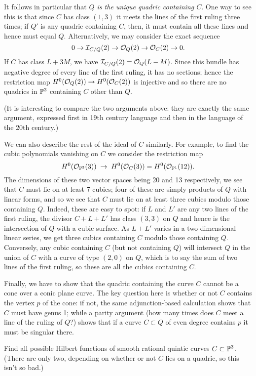 It follows in particular that \emph{$Q$ is the unique quadric containing $C$}. One way to see this is that since $C$ has class $(1,3)$ it meets the lines of the first ruling three times; if $Q'$ is any quadric containing $C$, then, it must contain all these lines and hence must equal $Q$. Alternatively, we may consider the exact sequence
$$
0 \to {\mathcal I}_{C/Q}(2) \to {\mathcal O}_Q(2)  \to {\mathcal O}_C(2) \to 0.
$$
If $C$ has class $L+3M$, we have ${\mathcal I}_{C/Q}(2) = {\mathcal O}_{Q}(L-M)$. Since this bundle has negative degree of every line of the first ruling, it has no sections; hence the restriction map $H^0({\mathcal O}_Q(2))  \to H^0({\mathcal O}_C(2))$ is injective and so there are no  quadrics in ${\mathbb P}^3$ containing $C$ other than $Q$.

(It is interesting to compare the two arguments above: they are exactly the same argument, expressed first in 19th century language and then in the language of the 20th century.)

We can also describe the rest of the ideal of $C$ similarly. For example, to find the cubic polynomials vanishing on $C$ we consider the restriction map
$$
H^0({\mathcal O}_{{\mathbb P}^3}(3)) \; \to \; H^0({\mathcal O}_{C}(3)) = H^0({\mathcal O}_{{\mathbb P}^1}(12)).
$$
The dimensions of these two vector spaces being 20 and 13 respectively, we see that $C$ must lie on at least 7 cubics; four of these are simply products of $Q$ with linear forms, and so we see that $C$ must lie on at least three cubics modulo those containing $Q$. Indeed, these are easy to spot: if $L$ and $L'$ are any two lines of the first ruling, the divisor $C + L + L'$ has class $(3,3)$ on $Q$ and hence is the intersection of $Q$ with a cubic surface. As $L+L'$ varies in a two-dimensional linear series, we get three cubics containing $C$ modulo those containing $Q$. Conversely, any cubic containing $C$ (but not containing $Q$) will intersect $Q$ in the union of $C$ with a curve of type $(2,0)$ on $Q$, which is to say the sum of two lines of the first ruling, so these are all the cubics containing $C$.

Finally, we have to show that the quadric containing the curve $C$ cannot be a cone over a conic plane curve. The key question here is whether or not $C$ contains the vertex $p$ of the cone: if not, the same adjunction-based calculation shows that $C$ must have genus 1; while a parity argument (how many times does $C$ meet a line of the ruling of $Q$?) shows that if a curve $C \subset Q$ of even degree contains $p$ it must be singular there.


\begin{exercise}
Find all possible Hilbert functions of smooth rational quintic  curves $C \subset {\mathbb P}^3$. (There are only two, depending on whether or not $C$ lies on a quadric, so this isn't so bad.)
\end{exercise}

